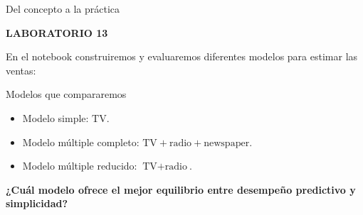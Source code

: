 \documentclass[aspectratio=169,11pt]{beamer}
\newcommand{\kicker}[1]{%
  {\scriptsize\bfseries\color{cAcc}\MakeUppercase{#1}}%
  \par\vspace{0.2em}%
}
\newcommand{\pregunta}[1]{%
  {\color{cAcc}\bfseries #1}%
}
\newenvironment{cerrado}[1]
  {\begin{block}{#1}
   \begin{minipage}{\linewidth}
   \raggedright}
  {\end{minipage}
   \end{block}}
\begin{document}
\begin{frame}{Del concepto a la práctica}

  \begin{center}
    \begin{minipage}{0.86\textwidth}

      \kicker{LABORATORIO 13}

      En el notebook construiremos y evaluaremos diferentes modelos
      para estimar las ventas:

      \vspace{0.35em}

      \begin{cerrado}{Modelos que compararemos}

        \begin{itemize}
          \setlength{\itemsep}{0.25em}

          \item Modelo simple: \(\text{TV}\).
          \item Modelo múltiple completo:
                \(\text{TV}+\text{radio}+\text{newspaper}\).
          \item Modelo múltiple reducido:
                \(\text{TV}+\text{radio}\).

        \end{itemize}

      \end{cerrado}

      \vspace{0.35em}

      \begin{center}
        \pregunta{¿Cuál modelo ofrece el mejor equilibrio entre
        desempeño predictivo y simplicidad?}
      \end{center}

    \end{minipage}
  \end{center}

\end{frame}
\end{document}
